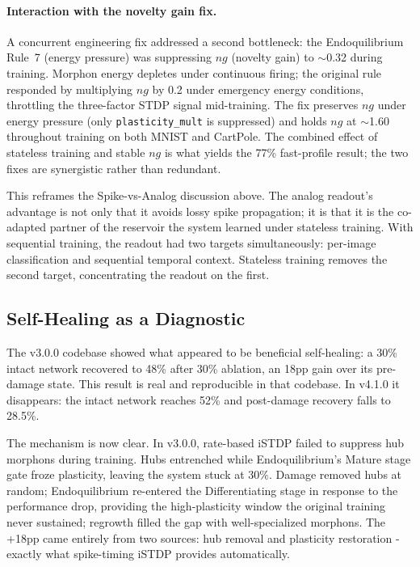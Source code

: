 \paragraph{Interaction with the novelty gain fix.}
A concurrent engineering fix addressed a second bottleneck: the Endoquilibrium Rule~7 (energy pressure) was suppressing $\mathit{ng}$ (novelty gain) to $\sim$0.32 during training. Morphon energy depletes under continuous firing; the original rule responded by multiplying $\mathit{ng}$ by 0.2 under emergency energy conditions, throttling the three-factor STDP signal mid-training. The fix preserves $\mathit{ng}$ under energy pressure (only \texttt{plasticity\_mult} is suppressed) and holds $\mathit{ng}$ at $\sim$1.60 throughout training on both MNIST and CartPole. The combined effect of stateless training and stable $\mathit{ng}$ is what yields the 77\% fast-profile result; the two fixes are synergistic rather than redundant.

This reframes the Spike-vs-Analog discussion above. The analog readout's advantage is not only that it avoids lossy spike propagation; it is that it is the co-adapted partner of the reservoir the system learned under stateless training. With sequential training, the readout had two targets simultaneously: per-image classification and sequential temporal context. Stateless training removes the second target, concentrating the readout on the first.

\subsection{Self-Healing as a Diagnostic}

The v3.0.0 codebase showed what appeared to be beneficial self-healing: a 30\% intact network recovered to 48\% after 30\% ablation, an 18pp gain over its pre-damage state. This result is real and reproducible in that codebase. In v4.1.0 it disappears: the intact network reaches 52\% and post-damage recovery falls to 28.5\%.

The mechanism is now clear. In v3.0.0, rate-based iSTDP failed to suppress hub morphons during training. Hubs entrenched while Endoquilibrium's Mature stage gate froze plasticity, leaving the system stuck at 30\%. Damage removed hubs at random; Endoquilibrium re-entered the Differentiating stage in response to the performance drop, providing the high-plasticity window the original training never sustained; regrowth filled the gap with well-specialized morphons. The +18pp came entirely from two sources: hub removal and plasticity restoration - exactly what spike-timing iSTDP provides automatically.


